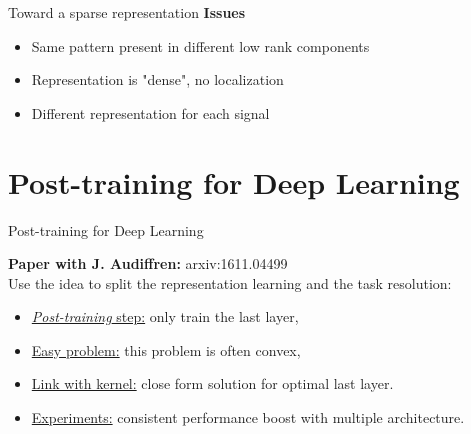 \documentclass[defense.tex]{subfiles}
\begin{document}
\begin{frame}{Toward a sparse representation}
\Large
	{\bf Issues}\\[1em]
	\begin{itemize}\itemsep1em
	\item[] Same pattern present in different low rank components
	\item[] Representation is "dense", no localization
	\item[] Different representation for each signal
	\end{itemize}

\end{frame}



\section{Post-training for Deep Learning}
\label{sec:post_train}


\begin{frame}{Post-training for Deep Learning}

	{\bf Paper with J. Audiffren: } arxiv:1611.04499\\[2em]

	Use the idea to split the representation learning and the task resolution:\\[1em]
	\begin{itemize}\itemindent1em\itemsep1.5em
		\item \underline{{\it Post-training} step:} only train the last layer,
		\item \underline{Easy problem:} this problem is often convex,
		\item \underline{Link with kernel:} close form solution for optimal last layer.
		\item \underline{Experiments:} consistent performance boost with multiple architecture.
	\end{itemize}
	
\end{frame}

\end{document}
